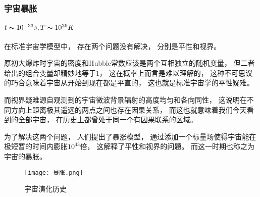 \documentclass[8pt]{beamer}
\begin{document}
        \begin{frame}[fragile]
            \frametitle{宇宙暴胀}
            \framesubtitle{$t\thicksim 10^{-33}s,T\thicksim10^{26}K$}
            \begin{multicols}{2} 
                \qquad
                在标准宇宙学模型中，
                存在两个问题没有解决，
                分别是平性和视界。

                \qquad
                原初大爆炸时宇宙的密度和Hubble常数应该是两个互相独立的随机变量，
                但二者给出的组合变量却精妙地等于1，
                这在概率上而言是难以理解的，
                这种不可思议的巧合意味着宇宙从开始到现在都是平直的，
                这也就是标准宇宙学的平性疑难。

                \qquad
                而视界疑难源自观测到的宇宙微波背景辐射的高度均匀和各向同性，
                这说明在不同方向上距离极其遥远的两点之间也存在因果关系，
                而这也就意味着我们今天看到的全部宇宙，
                在历史上都曾处于同一个有因果联系的区域。

                \qquad
                为了解决这两个问题，
                人们提出了暴涨模型，
                通过添加一个标量场使得宇宙能在极短暂的时间内膨胀$10^{43}$倍，
                这解释了平性和视界的问题。
                而这一时期也称之为宇宙的暴胀。

                \begin{figure}[h]
                    \centering
                    \texttt{[image: 暴胀.png]}  
                    \caption{宇宙演化历史}
                \end{figure}


            \end{multicols}
        \end{frame}
\end{document}
